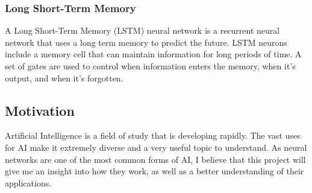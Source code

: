 \documentclass[titlepage]{article}
\begin{document}
\subsubsection{Long Short-Term Memory}
A Long Short-Term Memory (LSTM) neural network is a recurrent neural network that uses a long term memory to predict the future. LSTM neurons include a memory cell that can maintain information for long periods of time. A set of gates are used to control when information enters the memory, when it's output, and when it's forgotten.

\subsection{Motivation}
Artificial Intelligence is a field of study that is developing rapidly. The vast uses for AI make it extremely diverse and a very useful topic to understand. As neural networks are one of the most common forms of AI, I believe that this project will give me an insight into how they work, as well as a better understanding of their applications. 

\newpage
\end{document}
